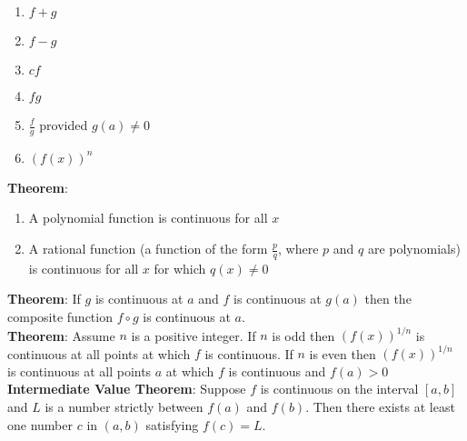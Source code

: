 \documentclass{article}
\begin{document}
\begin{itemize}
\begin{itemize}
		\begin{enumerate}
			\item $f + g$
			\item $f - g$
			\item $cf$
			\item $fg$
			\item $\frac{f}{g}$ provided $g(a) \neq 0$
			\item $(f(x))^n$
		\end{enumerate}
		\textbf{Theorem}:
		\begin{enumerate}
			\item A polynomial function is continuous for all $x$
			\item A rational function (a function of the form $\frac{p}{q}$, where $p$ and $q$ are polynomials) is continuous for all $x$ for which $q(x) \neq 0$
		\end{enumerate}
		\textbf{Theorem}: If $g$ is continuous at $a$ and $f$ is continuous at $g(a)$ then the composite function $f \circ g$ is continuous at $a$. \\
		\textbf{Theorem}: Assume $n$ is a positive integer. If $n$ is odd then $(f(x))^{1/n}$ is continuous at all points at which $f$ is continuous. If $n$ is even then $(f(x))^{1/n}$ is continuous at all points $a$ at which $f$ is continuous and $f(a) > 0$ \\
		\textbf{Intermediate Value Theorem}: Suppose $f$ is continuous on the interval $[a, b]$ and $L$ is a number strictly between $f(a)$ and $f(b)$. Then there exists at least one number $c$ in $(a,b)$ satisfying $f(c) = L$.
	\end{itemize}
\end{itemize}
\end{document}
